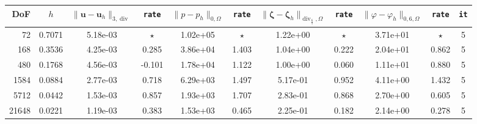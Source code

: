 \documentclass[11pt, reqno, a4paper, twoside]{article}
\newcommand{\bu}{\boldsymbol{u}}
\newcommand\bzeta{\boldsymbol{\zeta}}
\newcommand\vdiv{\mathop{\mathrm{div}}\nolimits}
\numberwithin{equation}{section}
\numberwithin{remark}{section}
\numberwithin{figure}{section}
\numberwithin{table}{section}
\begin{document}
\begin{table}[!t]\label{tab:conv.rates.weighted}
\setlength{\tabcolsep}{2.5pt}
\centering 
{\footnotesize \begin{tabular}{|rcccccccccc|}
\hline
DoF  &    $h$ & $\|\bu-\bu_h\|_{3,\vdiv}\!$  &  \texttt{rate} &  $\|p-p_h\|_{0,\Omega}$  &  \texttt{rate} & \(\|\bzeta-\bzeta_h\|_{\vdiv_{\frac65},\Omega}\)& \texttt{rate} &\(\|\varphi-\varphi_h\|_{0,6,\Omega}\)&\texttt{rate} &  \texttt{it} \\
\hline
  72 & 0.7071 & 5.18e-03 & $\star$ & 1.02e+05 & $\star$ & 1.22e+00 & $\star$ & 3.71e+01 &  $\star$ & 5 \\
    168 & 0.3536 & 4.25e-03 & 0.285 & 3.86e+04 & 1.403 & 1.04e+00 & 0.222 & 2.04e+01 & 0.862&  5\\
    480 & 0.1768 & 4.56e-03 & -0.101 & 1.78e+04 & 1.122 & 1.00e+00 & 0.060 & 1.11e+01 & 0.880&  5\\
   1584 & 0.0884 & 2.77e-03 & 0.718 & 6.29e+03 & 1.497 & 5.17e-01 & 0.952 & 4.11e+00 & 1.432&  5\\
    5712 & 0.0442 & 1.53e-03 & 0.857 & 1.93e+03 & 1.707 & 2.83e-01 & 0.868 & 2.70e+00 & 0.605&  5\\
21648 & 0.0221 & 1.19e-03 & 0.383 & 1.53e+03 & 0.465 & 2.25e-01 & 0.182 & 2.14e+00 & 0.278 & 5 \\
\hline


\end{tabular}}
\end{table}
\end{document}
